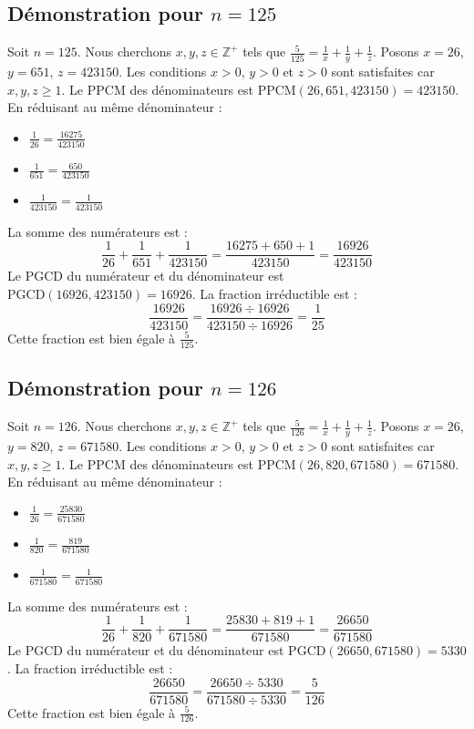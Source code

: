 \documentclass[11pt,a4paper]{article}
\begin{document}
\subsection{Démonstration pour $n = 125$}
Soit $n = 125$. Nous cherchons $x, y, z \in \mathbb{Z}^{+}$ tels que $\frac{5}{125} = \frac{1}{x} + \frac{1}{y} + \frac{1}{z}$.
Posons $x = 26$, $y = 651$, $z = 423150$.
Les conditions $x > 0$, $y > 0$ et $z > 0$ sont satisfaites car $x, y, z \geq 1$.
Le PPCM des dénominateurs est $\text{PPCM}(26, 651, 423150) = 423150$.
En réduisant au même dénominateur :
\begin{itemize}
    \item $\frac{1}{26} = \frac{16275}{423150}$
    \item $\frac{1}{651} = \frac{650}{423150}$
    \item $\frac{1}{423150} = \frac{1}{423150}$
\end{itemize}
La somme des numérateurs est :
$$ \frac{1}{26} + \frac{1}{651} + \frac{1}{423150} = \frac{16275 + 650 + 1}{423150} = \frac{16926}{423150} $$
Le PGCD du numérateur et du dénominateur est $\text{PGCD}(16926, 423150) = 16926$.
La fraction irréductible est :
$$ \frac{16926}{423150} = \frac{16926 \div 16926}{423150 \div 16926} = \frac{1}{25} $$
Cette fraction est bien égale à $\frac{5}{125}$.

\subsection{Démonstration pour $n = 126$}
Soit $n = 126$. Nous cherchons $x, y, z \in \mathbb{Z}^{+}$ tels que $\frac{5}{126} = \frac{1}{x} + \frac{1}{y} + \frac{1}{z}$.
Posons $x = 26$, $y = 820$, $z = 671580$.
Les conditions $x > 0$, $y > 0$ et $z > 0$ sont satisfaites car $x, y, z \geq 1$.
Le PPCM des dénominateurs est $\text{PPCM}(26, 820, 671580) = 671580$.
En réduisant au même dénominateur :
\begin{itemize}
    \item $\frac{1}{26} = \frac{25830}{671580}$
    \item $\frac{1}{820} = \frac{819}{671580}$
    \item $\frac{1}{671580} = \frac{1}{671580}$
\end{itemize}
La somme des numérateurs est :
$$ \frac{1}{26} + \frac{1}{820} + \frac{1}{671580} = \frac{25830 + 819 + 1}{671580} = \frac{26650}{671580} $$
Le PGCD du numérateur et du dénominateur est $\text{PGCD}(26650, 671580) = 5330$.
La fraction irréductible est :
$$ \frac{26650}{671580} = \frac{26650 \div 5330}{671580 \div 5330} = \frac{5}{126} $$
Cette fraction est bien égale à $\frac{5}{126}$.
\end{document}
